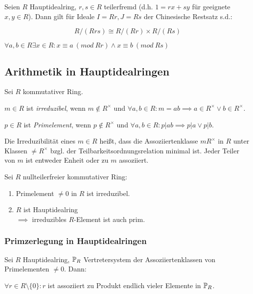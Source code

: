 Seien $R$ Hauptidealring, $r, s \in R$ teilerfremd (d.h. $1=rx+sy$ für geeignete $x, y \in R$). Dann gilt für Ideale $I = Rr, J = Rs$ der Chinesische Restsatz s.d.:

\vspace*{-2mm}
$$R/(Rrs) \cong R/(Rr) \times R/(Rs)$$

$\forall a, b \in R \exists x \in R : x \equiv a \ (mod \ Rr) \land x \equiv b \ (mod \ Rs)$

\subsection*{Arithmetik in Hauptidealringen}

Sei $R$ kommutativer Ring.

$m \in R$ ist \emph{irreduzibel}, wenn $m \notin R^\times$ und $\forall a, b \in R: m = ab \implies a \in R^\times \lor b \in R^\times$.

$p \in R$ ist \emph{Primelement}, wenn $p \notin R^\times$ und $\forall a, b \in R: p | ab \implies p | a \lor p | b$.

\spacing

Die Irreduzibilität eines $m \in R$ heißt, dass die Assoziiertenklasse $mR^\times$ in $R$ unter Klassen $\neq R^\times$ bzgl. der Teilbarkeitsordnungsrelation minimal ist. Jeder Teiler von $m$ ist entweder Enheit oder zu $m$ assoziiert.

\spacing

Sei $R$ nullteilerfreier kommutativer Ring:

\begin{enumerate}[label=(\alph*)]
	\item Primelement $\neq 0$ in $R$ ist irreduzibel.
	\item $R$ ist Hauptidealring \\ $\implies $ irreduzibles $R$-Element ist auch prim.
\end{enumerate}

\subsubsection*{Primzerlegung in Hauptidealringen}

Sei $R$ Hauptidealring, $\mathbb{P}_R$ Vertretersystem der Assoziiertenklassen von Primelementen $\neq 0$. Dann:

\vspace*{1mm}

$\forall r \in R \setminus \{0\} : r$ ist assoziiert zu Produkt endlich vieler Elemente in $\mathbb{P}_R$.

